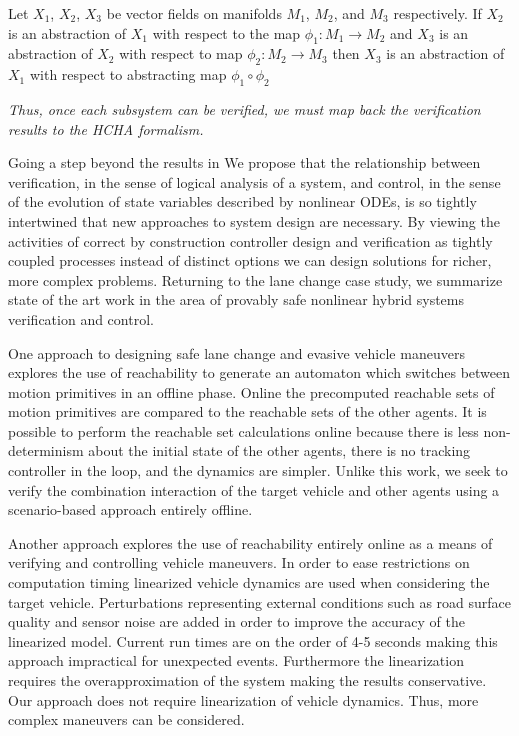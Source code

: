 \begin{prop}
	Let \(X_1\), \(X_2\), \(X_3\) be vector fields on manifolds \(M_1\), \(M_2\), and \(M_3\) respectively. If \(X_2\) is an abstraction of \(X_1\) with respect to the map \(\phi_1 : M_1 \rightarrow M_2\) and \(X_3\) is an abstraction of \(X_2\) with respect to map \(\phi_2 : M_2 \rightarrow M_3\) then \(X_3\) is an abstraction of \(X_1\) with respect to abstracting map \(\phi_1 \circ \phi_2\) \cite{Pappas1998}
\end{prop}

{\it Thus, once each subsystem can be verified, we must map back the verification results to the HCHA formalism.}

Going a step beyond the results in \cite{Pappas1998} We propose that the relationship between verification, in the sense of logical analysis of a system, and control, in the sense of the evolution of state variables described by nonlinear ODEs, is so tightly intertwined that new approaches to system design are necessary. By viewing the activities of correct by construction controller design and verification as tightly coupled processes instead of distinct options we can design solutions for richer, more complex problems. Returning to the lane change case study, we summarize state of the art work in the area of provably safe nonlinear hybrid systems verification and control.

One approach to designing safe lane change and evasive vehicle maneuvers explores the use of reachability to generate an automaton which switches between motion primitives in an offline phase. Online the precomputed reachable sets of motion primitives are compared to the reachable sets of the other agents. It is possible to perform the reachable set calculations online because there is less non-determinism about the initial state of the other agents, there is no tracking controller in the loop, and the dynamics are simpler.\cite{Hess2014} Unlike this work, we seek to verify the combination interaction of the target vehicle and other agents using a scenario-based approach entirely offline.

Another approach explores the use of reachability entirely online as a means of verifying and controlling vehicle maneuvers. In order to ease restrictions on computation timing linearized vehicle dynamics are used when considering the target vehicle. Perturbations representing external conditions such as road surface quality and sensor noise are added in order to improve the accuracy of the linearized model.\cite{Althoff2014b} Current run times are on the order of 4-5 seconds making this approach impractical for unexpected events. Furthermore the linearization requires the overapproximation of the system making the results conservative. Our approach does not require linearization of vehicle dynamics. Thus, more complex maneuvers can be considered. 

